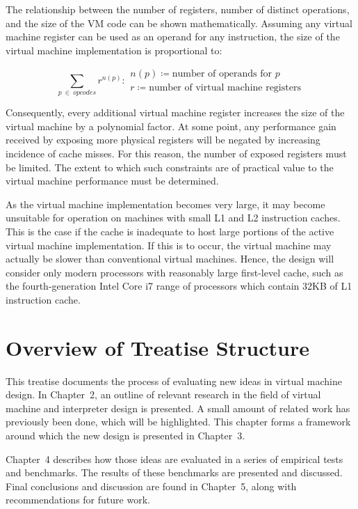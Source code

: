 		The relationship between the number of registers, number of distinct operations, and the size of the VM code can be shown mathematically. Assuming any virtual machine register can be used as an operand for any instruction, the size of the virtual machine implementation is proportional to:
		
		\[
		\sum_{p~\in~opcodes} r^{n(p)} : 
		\begin{array}{l}
		n(p) \coloneqq \text{number of operands for $p$} \\
		r \coloneqq \text{number of virtual machine registers}
		\end{array}
		\] 
		
		Consequently, every additional virtual machine register increases the size of the virtual machine by a polynomial factor. At some point, any performance gain received by exposing more physical registers will be negated by increasing incidence of cache misses. For this reason, the number of exposed registers must be limited. The extent to which such constraints are of practical value to the virtual machine performance must be determined.
		
		As the virtual machine implementation becomes very large, it may become unsuitable for operation on machines with small L1 and L2 instruction caches. This is the case if the cache is inadequate to host large portions of the active virtual machine implementation. If this is to occur, the virtual machine may actually be slower than conventional virtual machines. Hence, the design will consider only modern processors with reasonably large first-level cache, such as the fourth-generation Intel Core i7 range of processors which contain 32KB of L1 instruction cache.
				
	\section{Overview of Treatise Structure}
		This treatise documents the process of evaluating new ideas in virtual machine design. In Chapter~2, an outline of relevant research in the field of virtual machine and interpreter design is presented. A small amount of related work has previously been done, which will be highlighted. This chapter forms a framework around which the new design is presented in Chapter~3.
		
		Chapter~4 describes how those ideas are evaluated in a series of empirical tests and benchmarks. The results of these benchmarks are presented and discussed. Final conclusions and discussion are found in Chapter~5, along with recommendations for future work.

